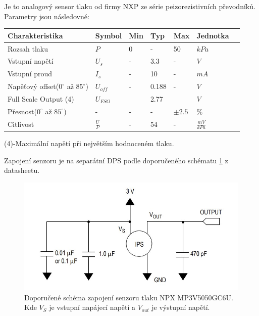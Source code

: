 \documentclass{ctuthesis}
\begin{document}
Je to analogový sensor tlaku od firmy NXP ze série peizorezistivních převodníků. Parametry jsou následovné: 
\begin{center}
\begin{tabular}{lllllll}
\toprule
Charakteristika                        & Symbol &  Min  & Typ & Max   & Jednotka &  \\ \midrule
Rozsah tlaku                           & $P$    &  0    &   -   & 50   & $kPa$ & \\
Vstupní napětí                         & $U_{s}$& - & 3.3 &  -  & $V$ &  \\
Vstupní proud                          & $I_{s}$ & - & 10  &  -  & $mA$ &  \\
Napěťový offset($0^{\circ}$ až $ 85^{\circ} $) & $U_{off}$& - & 0.188& -  & $V$ &  \\ 
Full Scale Output (4)                  & $U_{FSO}$ & &2.77& & $V$ & \\
Přesnost($0^{\circ}$ až $ 85^{\circ}$) & - & - & - & $\pm 2.5 $  &  $\%$ &\\
Citlivost                              & $\frac{U}{P}$ & - & 54 & - & $\frac{mV}{kPa}$ & \\
\bottomrule
\end{tabular}
(4)-Maximální napětí při největším hodnoceném tlaku.
\end{center}

Zapojení senzoru je na separátní DPS podle doporučeného schématu \ref{fig:nxp_recommended} z datasheetu. 


\begin{figure}[H]
    \centering
    \includegraphics{pictures/nxp_recommended.jpg}
    \caption{Doporučené schéma zapojení senzoru tlaku NPX MP3V5050GC6U. Kde $V_S$ je vstupní napájecí napětí a $V_{out}$ je výstupní napětí.}
    \label{fig:nxp_recommended}
\end{figure}
\end{document}
